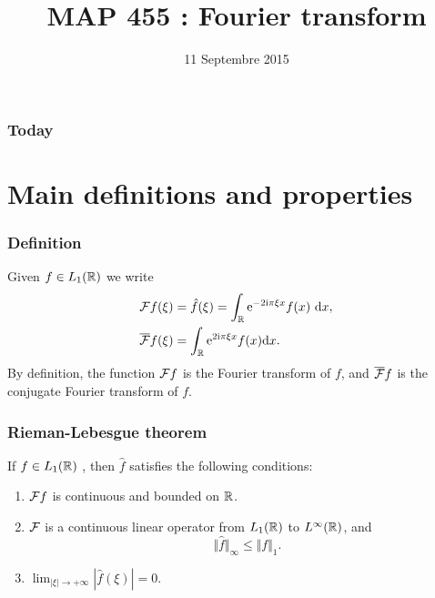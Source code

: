 

\title{MAP 455 : Fourier transform}

\date{11 Septembre 2015}
\maketitle



\begin{frame}
\frametitle{Today}
\tableofcontents
\end{frame}
\section{Main definitions and properties}
\begin{frame}
\frametitle{Definition}
\begin{definition}
Given $f\in L_1(\mathbb{R})$ we write
\begin{align*}
&\TF f(\xi)=\hat{f}(\xi)=\int_{\rset} \rme^{-2\rmi\pi\xi x}f(x)\ \rmd x, \\
&\TFC f(\xi)=\int_{\mathbb{R}}\rme^{2\rmi\pi\xi x}f(x) \rmd x. \\
\end{align*}
By definition, the function $\mathcal{F} f$ is the Fourier transform of $f$, and $\overline{\mathcal{F}} f$ is the conjugate Fourier transform of $f$.
\end{definition}
\end{frame}

\begin{frame}
\frametitle{Rieman-Lebesgue theorem}
\begin{theorem}  If $f\in L_1(\mathbb{R})$ , then $\hat{f}$ satisfies the following conditions:
\begin{enumerate}[label=(\roman*)]
\item $\mathcal{F} f$ is continuous  and bounded on $\mathbb{R}$.
\item $\mathcal{F}$  is a  continuous linear operator from $L_1(\mathbb{R})$  to $L^{\infty}(\mathbb{R})$, and
$$
\Vert\hat{f}\Vert_{\infty}\leq\Vert f\Vert_{1}.
$$
\item $\lim_{|\xi|\rightarrow+\infty} |\hat{f}(\xi)|=0$.
\end{enumerate}
\end{theorem}
\end{frame}



